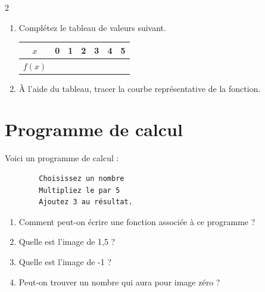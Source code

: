 \documentclass[10pt,a4paper]{article}
\begin{document}
\begin{multicols}{2}
    \begin{minipage}{0.45\textwidth}
    \begin{enumerate}
    \item Complétez le tableau de valeurs suivant.
    
    \begin{center}
        \renewcommand{\arraystretch}{1.5} %
        \setlength{\tabcolsep}{0.3cm} %
        \begin{tabular}{|c|c|c|c|c|c|c|}
        \hline
        \(x\) & 0 & 1 & 2 & 3 & 4 & 5 \\
        \hline
        \(f(x)\) &  &  &  &  &  &  \\
        \hline
        \end{tabular}
    \end{center}

    \vfill\null
    
    \item À l'aide du tableau, tracer la courbe représentative de la fonction.
    \end{enumerate}

    \vspace{1cm}

    \section{Programme de calcul}

    Voici un programme de calcul : 

    \begin{verbatim}
        Choisissez un nombre
        Multipliez le par 5
        Ajoutez 3 au résultat.
    \end{verbatim}
    \begin{enumerate}
        \item Comment peut-on écrire une fonction associée à ce programme ?
        \item Quelle est l'image de 1,5 ?
        \item Quelle est l'image de -1 ?
        \item Peut-on trouver un nombre qui aura pour image zéro ?
    \end{enumerate}
    \end{minipage}


     \vfill\null
    
    \hspace{-1cm}


\end{multicols}
\end{document}
